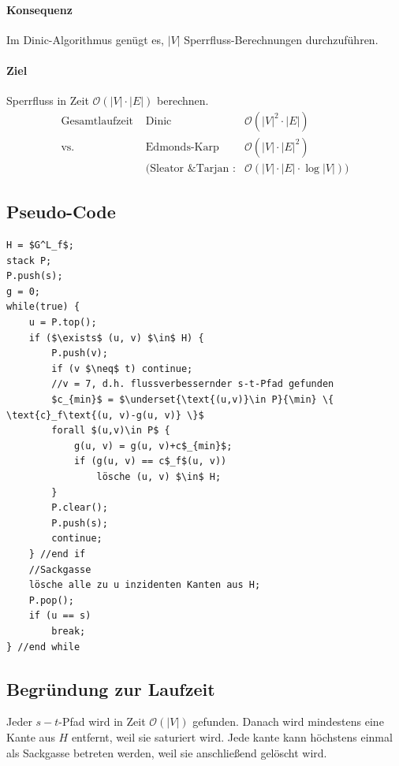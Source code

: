 \paragraph{Konsequenz}
Im Dinic-Algorithmus genügt es, $|V|$ Sperrfluss-Berechnungen durchzuführen.
\paragraph{Ziel}Sperrfluss in Zeit $\mathcal{O}(|V|\cdot|E|)$ berechnen.
\begin{align*}
\text{Gesamtlaufzeit }&\text{Dinic }&\mathcal{O}(|V|^2\cdot|E|)\\
\text{vs. }&\text{Edmonds-Karp }&\mathcal{O}(|V|\cdot|E|^2)\\
&\text{(Sleator \& Tarjan :}& \mathcal{O}(|V|\cdot|E|\cdot\log|V|))
\end{align*}
\subsection{Pseudo-Code}
\begin{lstlisting}[style=pseudo]
H = $G^L_f$;
stack P;
P.push(s);
g = 0;
while(true) {
	u = P.top();
	if ($\exists$ (u, v) $\in$ H) {
		P.push(v);
		if (v $\neq$ t) continue;
		//v = 7, d.h. flussverbessernder s-t-Pfad gefunden
		$c_{min}$ = $\underset{\text{(u,v)}\in P}{\min} \{ \text{c}_f\text{(u, v)-g(u, v)} \}$
		forall $(u,v)\in P$ {
			g(u, v) = g(u, v)+c$_{min}$;
			if (g(u, v) == c$_f$(u, v))
				lösche (u, v) $\in$ H;
		}
		P.clear();
		P.push(s);
		continue;
	} //end if
	//Sackgasse
	lösche alle zu u inzidenten Kanten aus H;
	P.pop();
	if (u == s)
		break;
} //end while
\end{lstlisting}
\subsection{Begründung zur Laufzeit}
Jeder $s-t$-Pfad wird in Zeit $\mathcal{O}(|V|)$ gefunden. Danach wird mindestens eine Kante aus $H$ entfernt, weil sie saturiert wird. Jede kante kann höchstens einmal als Sackgasse betreten werden, weil sie anschließend gelöscht wird.
